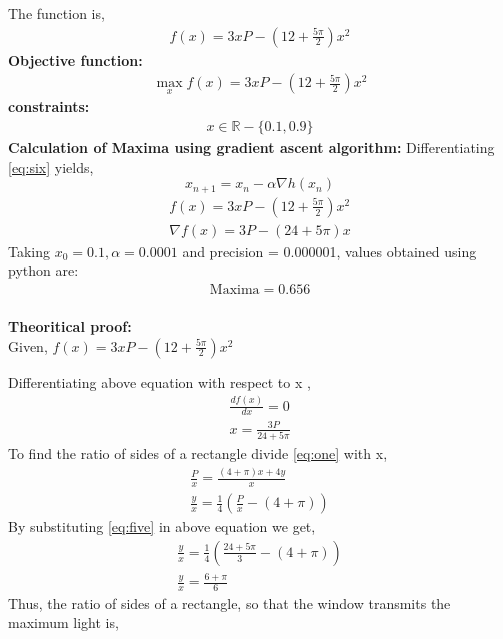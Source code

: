 \documentclass[10pt,a4paper]{report}
\begin{document}
\begin{multicols}{2}
The function is,
    \begin{align}
    \label{eq:two}
    f(x)=3xP-(12+\frac{5\pi}{2})x^2
    \end{align}
	\textbf{Objective function:}
	\begin{align}
	\max_xf(x)= 3xP-(12+\frac{5\pi}{2})x^2
        \end{align}
	\textbf{constraints:}\\
	\begin{align}
		x \in \mathbb{R}-\{0.1,0.9\} 
	\end{align}
\textbf{Calculation of Maxima using gradient ascent algorithm:}
Differentiating  \eqref{eq:six} yields,
\begin{equation}
       \boxed{x_{n+1} = x_n - \alpha \nabla h(x_n)} 
\end{equation}
\begin{align}
\label{eq:six}
f(x) = 3xP-(12+\frac{5\pi}{2})x^2 \\
\nabla f(x) = 3P-(24+5\pi)x
\end{align}
\vspace{1mm}
Taking $x_0=0.1,\alpha=0.0001$ and precision = 0.000001, values obtained using python are:
    \begin{align}
        \boxed{\text{Maxima} =0.656}\\     
    \end{align}
\raggedright\textbf{Theoritical proof:}\\
\vspace{4mm}
Given,
\centering
$f(x)=3xP-(12+\frac{5\pi}{2})x^2$\\
\raggedright Differentiating above equation with respect to x ,
\begin{align}
\frac{df(x)}{dx}=0\\
\label{eq:five}
x=\frac{3P}{24+5\pi}
\end{align}
To find the ratio of sides of a rectangle divide \eqref{eq:one} with x, 
\begin{align}
\frac{P}{x}=\frac{(4+\pi)x+4y}{x}\\
\frac{y}{x}=\frac{1}{4}(\frac{P}{x}-(4+\pi))
\end{align}
By substituting \eqref{eq:five} in above equation we get,
\begin{align}
\frac{y}{x}=\frac{1}{4}(\frac{24+5\pi}{3}-(4+\pi))\\
\frac{y}{x}=\frac{6+\pi}{6}
\end{align}
Thus, the ratio of sides of a rectangle, so that the window transmits the maximum light is,\\

\end{multicols}
\end{document}
